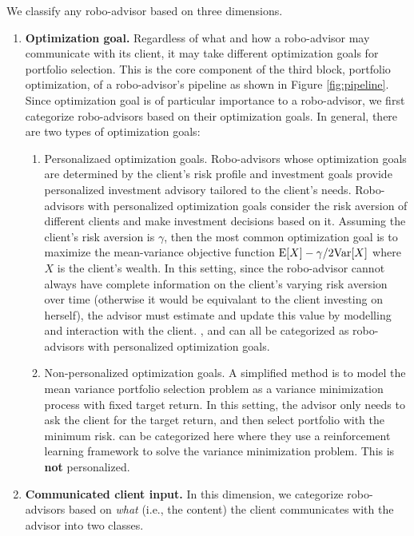 We classify any robo-advisor based on three dimensions.\begin{enumerate}
    \item \textbf{Optimization goal.} Regardless of what and how a robo-advisor may communicate with its client, it may take different optimization goals for portfolio selection. This is the core component of the third block, portfolio optimization, of a robo-advisor's pipeline as shown in Figure \ref{fig:pipeline}. Since optimization goal is of particular importance to a robo-advisor, we first categorize robo-advisors based on their optimization goals. In general, there are two types of optimization goals:\begin{enumerate}
        \item Personalizaed optimization goals. Robo-advisors whose optimization goals are determined by the client's risk profile and investment goals provide personalized investment advisory tailored to the client's needs. Robo-advisors with personalized optimization goals consider the risk aversion of different clients and make investment decisions based on it. Assuming the client's risk aversion is $\gamma$, then the most common optimization goal is to maximize the mean-variance objective function $\mathrm{E}[X]-\gamma/2\mathrm{Var}[X]$ where $X$ is the client's wealth. In this setting, since the robo-advisor cannot always have complete information on the client's varying risk aversion over time (otherwise it would be equivalant to the client investing on herself), the advisor must estimate and update this value by modelling and interaction with the client. ,   and  can all be categorized as robo-advisors with personalized optimization goals.
        \item Non-personalized optimization goals. A simplified method is to model the mean variance portfolio selection problem as a variance minimization process with fixed target return. In this setting, the advisor only needs to ask the client for the target return, and then select portfolio with the minimum risk.  can be categorized here where they use a reinforcement learning framework to solve the variance minimization problem. This is \textbf{not} personalized.
    \end{enumerate}
    \item \textbf{Communicated client input.} In this dimension, we categorize robo-advisors based on \textit{what} (i.e., the content) the client communicates with the advisor into two classes.\begin{enumerate}

\end{enumerate}
\end{enumerate}
